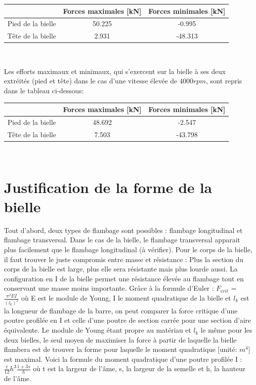 \documentclass[a4paper,oneside,12pt]{report}
\begin{document}
\begin{center}
\begin{tabular}{|c||c|c|}
\hline 
\ & Forces maximales [kN] & Forces minimales [kN] \\ 
\hline 
Pied de la bielle & 50.225 & -0.995 \\ 
\hline 
Tête de la bielle & 2.931 & -48.313 \\ 
\hline 
\end{tabular} \\
\end{center}

Les efforts maximaux et minimaux, qui s'exercent sur la bielle à ses deux extréités (pied et tête) dans le cas d'une vitesse élevée de $4000rpm$, sont repris dans le tableau ci-dessous: \\

\begin{center}
\begin{tabular}{|c||c|c|}
\hline 
\ & Forces maximales [kN] & Forces minimales [kN] \\ 
\hline 
Pied de la bielle & 48.692 & -2.547 \\ 
\hline 
Tête de la bielle &  7.503 & -43.798 \\ 
\hline 
\end{tabular} \\
\end{center}

\section{Justification de la forme de la bielle}

Tout d'abord, deux types de flambage sont possibles : flambage longitudinal et flambage transversal. Dans le cas de la bielle, le flambage transversal apparait plus facilement que le flambage longitudinal (à vérifier). Pour le corps de la bielle, il faut trouver le juste compromis entre masse et résistance : Plus la section du corps de la bielle est large, plus elle sera résistante mais plus lourde aussi. La configuration en I de la bielle permet une résistance élevée au flambage tout en conservant une masse moins importante. Grâce à la formule d'Euler : $F_{crit}$ = $\frac{\pi^2EI}{(l_k)^2}$ où E est le module de Young, I le moment quadratique de la bielle et $l_k$ est la longueur de flambage de la barre, on peut comparer la force critique d'une poutre profilée en I et celle d'une poutre de section carrée pour une section d'aire équivalente. Le module de Young étant propre au matériau et $l_k$ le même pour les deux bielles, le seul moyen de maximiser la force à partir de laquelle la bielle flambera est de trouver la forme pour laquelle le moment quadratique [unité: $m^4$] est maximal. Voici la formule du moment quadratique d'une poutre profilée I : $\frac{t}{12}h^3\frac{1+3s}{h}$ où t est la largeur de l'âme, s, la largeur de la semelle et h, la hauteur de l'âme.
\end{document}
